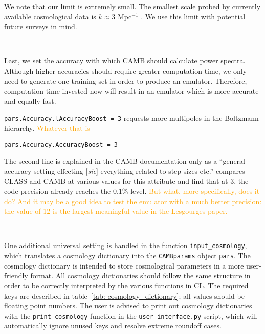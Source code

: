 We note that our limit is extremely small. The smallest scale probed by
currently available cosmological data is $k \approx 3$ Mpc$^{-1}$
. We use this limit with potential future surveys in mind.

\

Last, we set the accuracy with which CAMB should calculate power spectra.
Although higher accuracies should require greater computation time, we only
need to generate one training set in order to produce an emulator. Therefore,
computation time invested now will result in an emulator which is more
accurate and equally fast.

\verb|pars.Accuracy.lAccuracyBoost = 3| \quad requests more multipoles in the 
Boltzmann hierarchy. \textcolor{orange}{Whatever that is}

\verb|pars.Accuracy.AccuracyBoost = 3| 

The second line is explained in the CAMB documentation only as a ``general 
accuracy setting effecting [\textit{sic}] everything related to step sizes 
etc.'' \citet{Lesgourges} compares CLASS and CAMB at various values for this
attribute and find that at 3, the code precision already reaches the 0.1\% 
level. \textcolor{orange}{But what, more specifically, does it do? And it may
be a good idea to test the emulator with a much better precision: the value of
12 is the largest meaningful value in the Lesgourges paper.}

\

One additional universal setting is handled in the function
\verb|input_cosmology|, which translates a cosmology dictionary into 
the \verb|CAMBparams| object \verb|pars|. The cosmology dictionary is
intended to store cosmological parameters in a more user-friendly format.
All cosmology dictionaries should follow the same structure in order to be 
correctly interpreted by the various functions in CL. The required keys are 
described in table~\ref{tab: cosmology_dictionary}; all
values should be floating point numbers. The user is advised to print out
cosmology dictionaries with the \verb|print_cosmology| function in the
\verb|user_interface.py| script, which will automatically ignore unused keys
and resolve extreme roundoff cases.


